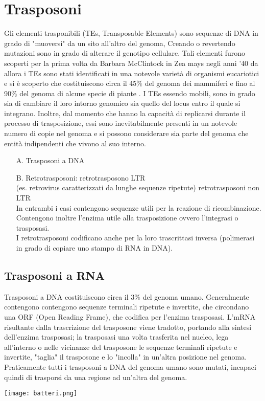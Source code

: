 \documentclass{article}
\begin{document}
\section{Trasposoni}
Gli elementi trasponibili (TEs, Transposable Elements) sono sequenze di DNA in grado di "muoversi" da
un sito all'altro del genoma,
Creando o revertendo mutazioni sono in grado di alterare il genotipo cellulare.
Tali elementi furono scoperti per la prima volta da Barbara McClintock in Zea mays negli anni '40
da allora i TEs sono stati identificati in una notevole varietà di organismi eucariotici e si è scoperto che
costituiscono circa il 45$\%$ del genoma dei mammiferi e fino al 90$\%$ del genoma di alcune specie di
piante .
I TEs essendo mobili, sono in grado sia di cambiare il loro intorno genomico sia quello del locus entro il
quale si integrano.
Inoltre, dal momento che hanno la capacità di replicarsi durante il processo di trasposizione, essi sono
inevitabilmente presenti in un notevole numero di copie nel genoma e si possono considerare sia parte
del genoma che entità indipendenti che vivono al suo interno.
\begin{itemize}
    \item[A. ] Trasposoni a DNA
    \item[B. ] Retrotrasposoni:
        \subitem retrotrasposono LTR\\(es. retrovirus caratterizzati da lunghe sequenze ripetute)
        \subitem retrotrasposoni non LTR\\
        In entrambi i casi contengono sequenze utili per la reazione di ricombinazione.\\
        Contengono inoltre l'enzima utile alla trasposizione ovvero l'integrasi o trasposasi.\\
        I retrotrasposoni codificano anche per la loro trascrittasi inversa (polimerasi in grado di copiare uno stampo di RNA in DNA).
\end{itemize}

\subsection{Trasposoni a RNA}
Trasposoni a DNA costituiscono circa il 3$\%$ del genoma umano.
Generalmente contengono contengono sequenze terminali ripetute e invertite, che
circondano una ORF (Open Reading Frame), che codifica per l'enzima trasposasi.
L'mRNA risultante dalla trascrizione del trasposone viene tradotto, portando alla sintesi
dell'enzima trasposasi; la trasposasi una volta trasferita nel nucleo, lega all'interno o nelle vicinanze del trasposone
le sequenze terminali ripetute e invertite, "taglia" il trasposone e lo "incolla" in un'altra
posizione nel genoma.
Praticamente tutti i trasposoni a DNA del genoma umano sono mutati, incapaci quindi di trasporsi da una regione ad un'altra del genoma.
\begin{center}
    \texttt{[image: batteri.png]}
\end{center}
\end{document}
